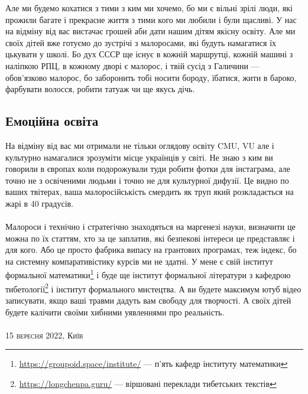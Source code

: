 \newpage
Але ми будемо кохатися з тими з ким ми хочемо, бо ми є вільні зрілі люди, які
прожили багате і прекрасне життя з тими кого ми любили і були щасливі. У
нас на відміну від вас вистачає грошей аби дати нашим дітям якісну освіту.
Але ми своїх дітей вже готуємо до зустрічі з малоросами, які будуть намагатися
їх цькувати у школі. Бо дух СССР ще існує в кожній маршрутці, кожній машині з
наліпкою РПЦ, в кожному дворі є малорос, і твій сусід з Галичини --- обов'язково
малорос, бо заборонить тобі носити бороду, їбатися, жити в бароко, фарбувати
волосся, робити татуаж чи ще якусь дічь.

\subsection{Емоційна освіта}

На відміну від вас ми отримали не тільки оглядову освіту CMU, VU але і культурно
намагалися зрозуміти місце українців у світі. Не знаю з ким ви говорили в європах
коли подорожували туди робити фотки для інстаграма, але точно не з освіченими
людьми і точно не для культурної дифузії. Це видно по ваших твітерах, ваша
малоросійськість смердить як труп який розкладається на жарі в 40 градусів. 
\\
\\
Малороси і технічно і стратегічно знаходяться на маргенезі науки, визначити
це можна по їх статтям, хто за це заплатив, які безпекові інтереси це
представляє і для кого. Або це просто фабрика випасу на грантових програмах,
теж індекс, бо на системну компаративістику курсів ми не здатні. У мене є
свій інститут формальної математики\footnote{\url{https://groupoid.space/institute/} --- п'ять кафедр інституту математики} і буде ще інститут формальної літератури
з кафедрою тибетології\footnote{\url{https://longchenpa.guru/} --- віршовані переклади тибетських текстів} і інститут формального мистецтва. А ви будете максимум
ютуб відео записувати, якщо ваші травми дадуть вам свободу для творчості.
А своїх дітей будете калічити своїми хибними уявленнями про реальність.
\\
\\
\textsc{\footnotesize 15 вересня 2022, Київ}

\normalsize
